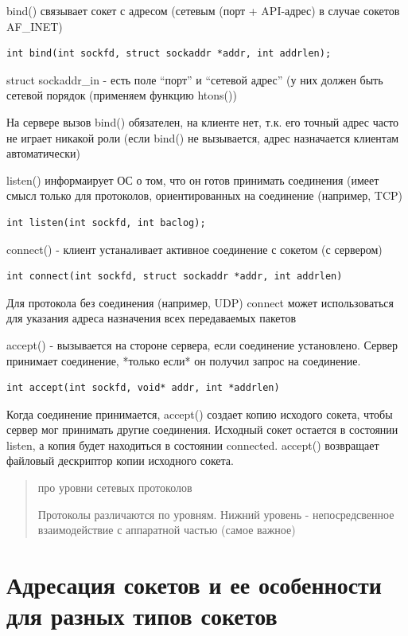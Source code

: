 bind() связывает сокет с адресом (сетевым (порт + API-адрес) в случае сокетов AF\_INET)

\begin{lstlisting}
int bind(int sockfd, struct sockaddr *addr, int addrlen);
\end{lstlisting}

struct sockaddr\_in - есть поле “порт” и “сетевой адрес” (у них должен быть сетевой порядок (применяем функцию htons())

На сервере вызов bind() обязателен, на клиенте нет, т.к. его точный адрес часто не играет никакой роли (если bind() не вызывается, адрес назначается клиентам автоматически)

listen() информаирует ОС о том, что он готов принимать соединения (имеет смысл только для протоколов, ориентированных на соединение (например, TCP)

\begin{lstlisting}
int listen(int sockfd, int baclog);
\end{lstlisting}
connect() - клиент устаналивает активное соединение с сокетом (с сервером)
\begin{lstlisting}
int connect(int sockfd, struct sockaddr *addr, int addrlen)
\end{lstlisting}

Для протокола без соединения (например, UDP) connect может использоваться для указания адреса назначения всех передаваемых пакетов

accept() - вызывается на стороне сервера, если соединение установлено. Сервер принимает соединение, *только если* он получил запрос на соединение.

\begin{lstlisting}
int accept(int sockfd, void* addr, int *addrlen)
\end{lstlisting}

Когда соединение принимается, accept()  создает копию исходого сокета, чтобы сервер мог принимать другие соединения. Исходный сокет остается в состоянии listen, а копия будет находиться в состоянии connected. accept() возвращает файловый дескриптор копии исходного сокета.

\begin{quote}
про уровни сетевых протоколов

Протоколы различаются по уровням. Нижний уровень - непосредсвенное взаимодействие с аппаратной частью (самое важное)
\end{quote}

\section{Адресация сокетов и ее особенности для разных типов сокетов}

